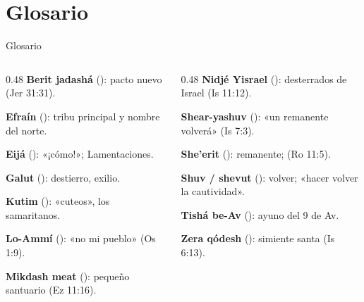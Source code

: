\section{Glosario}
\begin{frame}{Glosario}
\begin{columns}[T,onlytextwidth]
\begin{column}{0.48\textwidth}\footnotesize
\textbf{Berit jadashá} (): pacto nuevo (Jer 31:31).\par\smallskip
\textbf{Efraín} (): tribu principal y nombre del norte.\par\smallskip
\textbf{Eijá} (): «¡cómo!»; Lamentaciones.\par\smallskip
\textbf{Galut} (): destierro, exilio.\par\smallskip
\textbf{Kutim} (): «cuteos», los samaritanos.\par\smallskip
\textbf{Lo-Ammí} (): «no mi pueblo» (Os 1:9).\par\smallskip
\textbf{Mikdash meat} (): pequeño santuario (Ez 11:16).
\end{column}
\begin{column}{0.48\textwidth}\footnotesize
\textbf{Nidjé Yisrael} (): desterrados de Israel (Is 11:12).\par\smallskip
\textbf{Shear-yashuv} (): «un remanente volverá» (Is 7:3).\par\smallskip
\textbf{She'erit} (): remanente;  (Ro 11:5).\par\smallskip
\textbf{Shuv / shevut} (): volver; «hacer volver la cautividad».\par\smallskip
\textbf{Tishá be-Av} (): ayuno del 9 de Av.\par\smallskip
\textbf{Zera qódesh} (): simiente santa (Is 6:13).
\end{column}
\end{columns}
\end{frame}

